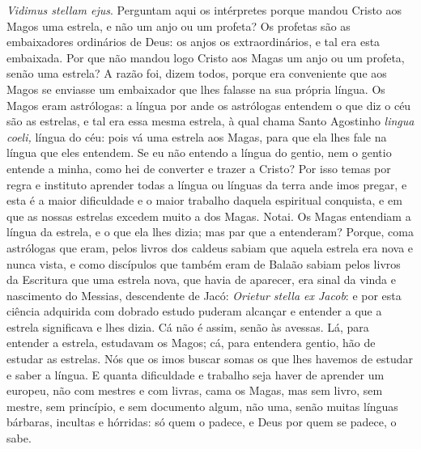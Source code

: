 \emph{Vidimus stellam ejus}. Perguntam aqui os intérpretes
porque mandou Cristo aos Magos uma estrela, e não um anjo ou um profeta?
Os profetas são as embaixadores ordinários de Deus: os anjos os
extraordinários, e tal era esta embaixada. Por que não mandou logo
Cristo aos Magas um anjo ou um profeta, senão uma estrela? A razão foi,
dizem todos, porque era conveniente que aos Magos se enviasse um
embaixador que lhes falasse na sua própria língua. Os Magos eram
astrólogas: a língua por ande os astrólogas entendem o que diz o céu são
as estrelas, e tal era essa mesma estrela, à qual chama Santo Agostinho
\emph{lingua coeli,} língua do céu: pois vá uma estrela aos Magas, para
que ela lhes fale na língua que eles entendem. Se eu não entendo a
língua do gentio, nem o gentio entende a minha, como hei de converter e
trazer a Cristo? Por isso temas por regra e instituto aprender todas a
língua ou línguas da terra ande imos pregar, e esta é a maior
dificuldade e o maior trabalho daquela espiritual conquista, e em que as
nossas estrelas excedem muito a dos Magas. Notai. Os Magas entendiam a
língua da estrela, e o que ela lhes dizia; mas par que a entenderam?
Porque, coma astrólogas que eram, pelos livros dos caldeus sabiam que
aquela estrela era nova e nunca vista, e como discípulos que também eram
de Balaão sabiam pelos livros da Escritura que uma estrela nova, que
havia de aparecer, era sinal da vinda e nascimento do Messias,
descendente de Jacó: \emph{Orietur stella ex Jacob}: e
por esta ciência adquirida com dobrado estudo puderam alcançar e
entender a que a estrela significava e lhes dizia. Cá não é assim, senão
às avessas. Lá, para entender a estrela, estudavam os Magos; cá, para
entendera gentio, hão de estudar as estrelas. Nós que os imos buscar
somas os que lhes havemos de estudar e saber a língua. E quanta
dificuldade e trabalho seja haver de aprender um europeu, não com
mestres e com livras, cama os Magas, mas sem livro, sem mestre, sem
princípio, e sem documento algum, não uma, senão muitas línguas
bárbaras, incultas e hórridas: só quem o padece, e Deus por quem se
padece, o sabe.

